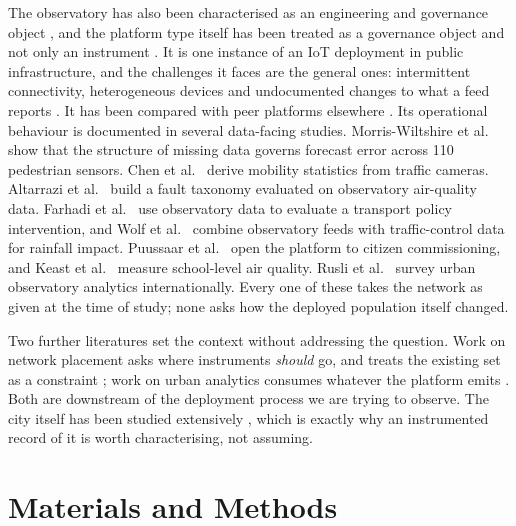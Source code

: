 \documentclass{article}
\begin{document}
The observatory has also been characterised as an engineering and governance object
\cite{james2022realizing,wolf2025enduring}, and the platform type
itself has been treated as a governance object and not only an instrument
\cite{barns2018cities,cape1971overview}. It is one instance of an IoT deployment in
public infrastructure, and the challenges it faces are the general ones: intermittent
connectivity, heterogeneous devices and undocumented changes to what a feed
reports \cite{jamshed2022challenges,zeng2024sensors}. It has been compared with peer
platforms elsewhere \cite{derbali2025review,fernandesbarata2025learning,li2025space,longley2024infrastructure}.
Its operational
behaviour is documented in several data-facing studies. Morris-Wiltshire et
al.~\cite{morriswiltshire2026} show that the structure of missing data governs forecast
error across \num{110} pedestrian sensors. Chen et al.~\cite{chen2021cameras} derive
mobility statistics from traffic cameras. Altarrazi et al.~\cite{altarrazi2025dqd}
build a fault taxonomy evaluated on observatory air-quality data. Farhadi et
al.~\cite{farhadi2023ml} use observatory data to evaluate a transport policy
intervention, and Wolf et al.~\cite{wolf2023rainfall} combine observatory feeds with
traffic-control data for rainfall impact. Puussaar et al.~\cite{puussaar2022sensemystreet}
open the platform to citizen commissioning, and Keast et al.~\cite{keast2022} measure
school-level air quality. Rusli et al.~\cite{rusli2023review} survey urban observatory
analytics internationally. Every one of these takes the network as given at the time of
study; none asks how the deployed population itself changed.

Two further literatures set the context without addressing the question. Work on
network placement asks where instruments \emph{should} go, and treats the existing set
as a constraint
\cite{ayati2025optimizing,s2025wireless,nazeeyaanjum2025sensors,xu2024getting,malaker2024disparity};
work on urban analytics consumes whatever the platform emits
\cite{theodorakopoulos2026analytics,avram2026advancing,yu2023remote,huang2024crowdsourcing,enlund2022role}.
Both are downstream of the deployment process we are trying to observe. The city itself
has been studied extensively \cite{barke2025morphogenesis,wood2025myth}, which is
exactly why an instrumented record of it is worth characterising, not assuming.

\section{Materials and Methods}
\label{sec:methods}
\end{document}
